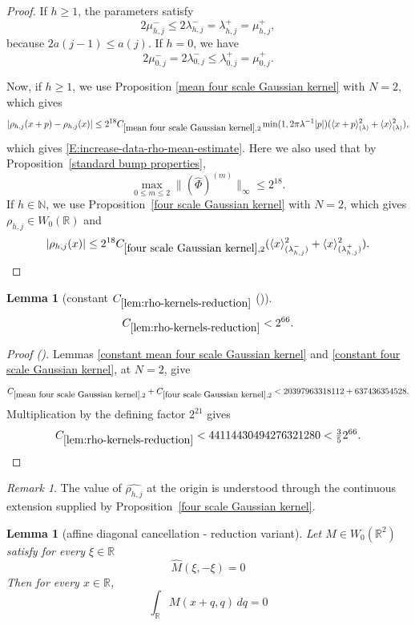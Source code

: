 \documentclass[12pt,reqno]{amsart}
\newcommand{\auto}{{({\tiny\faCar})}}
\theoremstyle{plain}
\newtheorem{lemma}[theorem]{Lemma}
\numberwithin{equation}{section}
\theoremstyle{remark}
\newtheorem{rem}{Remark}[section]
\newcommand{\uses}[1]{}
\newcommand{\usesdefs}[1]{}
\newcommand{\R}{{\mathbb R}}
\newcommand{\N}{{\mathbb N}}
\begin{document}
\begin{proof}
If \(h\geq1\), the parameters satisfy
\[
2\mu_{h,j}^-
\leq
2\lambda_{h,j}^-
=
\lambda_{h,j}^+
=
\mu_{h,j}^+,
\]
because \(2a(j-1)\leq a(j)\).
If $h=0$, we have
\[
2\mu_{0,j}^-
=
2\lambda_{0,j}^-
\leq
\lambda_{0,j}^+
=
\mu_{0,j}^+.
\]


Now, if $h\ge 1$, we  use Proposition
\ref{mean four scale Gaussian kernel}   with $N=2$, which  gives
\[|\rho_{h,j}(x+p)-\rho_{h,j}(x)| \le 2^{18} C_{\ref{mean four scale Gaussian kernel},2} \min(1,2\pi \lambda^{-1}|p|) (\langle x+p\rangle^2_{(\lambda)}+
\langle x\rangle^2_{(\lambda)}),
\]
which gives \eqref{E:increase-data-rho-mean-estimate}.
Here we also used that by Proposition~\ref{standard bump properties},
\[
\max_{0\leq m\leq2}
\|(\widehat\Phi)^{(m)}\|_\infty
\leq2^{18}.
\]
If $h\in \N$, we use  Proposition~\ref{four scale Gaussian kernel}   with $N=2$, which   gives $\rho_{h,j}\in W_0(\R)$ and
\[ |\rho_{h,j}(x)| \le 2^{18}C_{\ref{four scale Gaussian kernel},2} (\langle x\rangle^2_{(\lambda_{h,j}^-)} + \langle x\rangle^2_{(\lambda_{h,j}^+)}). \]
\end{proof}

\begin{lemma}[constant $C_{\ref{lem:rho-kernels-reduction}}$ \auto]\label{constant rho kernels reduction}\uses{lem:rho-kernels-reduction,constant mean four scale Gaussian kernel,constant four scale Gaussian kernel,mean four scale Gaussian kernel,four scale Gaussian kernel}\usesdefs{}
\begin{equation}\label{constant rho kernels reduction bound}
C_{\ref{lem:rho-kernels-reduction}}
<2^{66}.
\end{equation}
\end{lemma}
\begin{proof}[Proof \auto]
Lemmas \ref{constant mean four scale Gaussian kernel} and \ref{constant four scale Gaussian kernel}, at $N=2$, give
\[
C_{\ref{mean four scale Gaussian kernel},2}
+C_{\ref{four scale Gaussian kernel},2}
<20397963318112+637436354528.
\]
Multiplication by the defining factor $2^{21}$ gives
\[
C_{\ref{lem:rho-kernels-reduction}}
<44114430494276321280<\tfrac35 2^{66}.
\]
\end{proof}


\begin{rem}
The value of $\widehat{\rho_{h,j}}$   at the origin is understood through the continuous
extension supplied by Proposition~\ref{four scale Gaussian kernel}.
\end{rem}

\begin{lemma}[affine diagonal cancellation - reduction variant]
\label{lem:affine-diagonal-cancellation-reduction}\uses{W_0 fiber integrals}\usesdefs{auto:Wiener-space-definition}
Let \(M\in W_0(\mathbb R^2)\) satisfy for every \(\xi\in\mathbb R\)
\begin{equation}\label{auto:affine-diagonal-cancellation-assumption}
\widehat M(\xi,-\xi)=0
\end{equation}
 Then for every \(x\in\mathbb R\),
\begin{equation}
    \label{E:affine-diagonal-cancellation}
    \int_{\mathbb R}M(x+q,q)\,dq=0
\end{equation}
\end{lemma}
\end{document}
